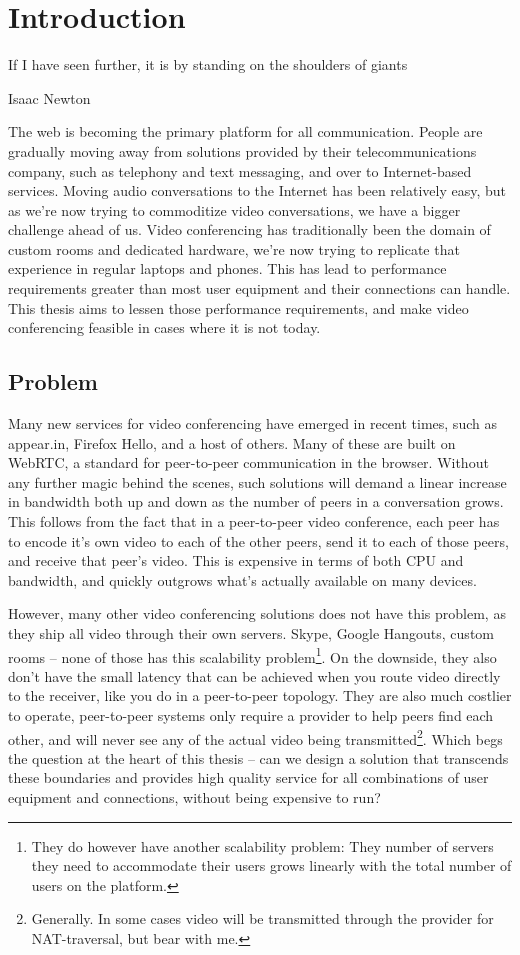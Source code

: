 \chapter{Introduction}\label{chp:introduction}

\epigraph{If I have seen further, it is by standing on the shoulders of giants}{Isaac Newton}

The web is becoming the primary platform for all communication. People are gradually moving away from solutions provided by their telecommunications company, such as telephony and text messaging, and over to Internet-based services. Moving audio conversations to the Internet has been relatively easy, but as we're now trying to commoditize video conversations, we have a bigger challenge ahead of us. Video conferencing has traditionally been the domain of custom rooms and dedicated hardware, we're now trying to replicate that experience in regular laptops and phones. This has lead to performance requirements greater than most user equipment and their connections can handle. This thesis aims to lessen those performance requirements, and make video conferencing feasible in cases where it is not today.


\section{Problem}

Many new services for video conferencing have emerged in recent times, such as appear.in, Firefox Hello, and a host of others. Many of these are built on WebRTC, a standard for peer-to-peer communication in the browser. Without any further magic behind the scenes, such solutions will demand a linear increase in bandwidth both up and down as the number of peers in a conversation grows. This follows from the fact that in a peer-to-peer video conference, each peer has to encode it's own video to each of the other peers, send it to each of those peers, and receive that peer's video. This is expensive in terms of both CPU and bandwidth, and quickly outgrows what's actually available on many devices.

However, many other video conferencing solutions does not have this problem, as they ship all video through their own servers. Skype, Google Hangouts, custom rooms -- none of those has this scalability problem\footnote{They do however have another scalability problem: They number of servers they need to accommodate their users grows linearly with the total number of users on the platform.}. On the downside, they also don't have the small latency that can be achieved when you route video directly to the receiver, like you do in a peer-to-peer topology. They are also much costlier to operate, peer-to-peer systems only require a provider to help peers find each other, and will never see any of the actual video being transmitted\footnote{Generally. In some cases video will be transmitted through the provider for NAT-traversal, but bear with me.}. Which begs the question at the heart of this thesis -- can we design a solution that transcends these boundaries and provides high quality service for all combinations of user equipment and connections, without being expensive to run?

